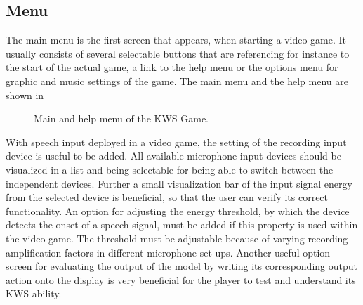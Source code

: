 \subsection{Menu}\label{sec:game_design_menu}
The main menu is the first screen that appears, when starting a video game. 
It usually consists of several selectable buttons that are referencing for instance to the start of the actual game, a link to the help menu or the options menu for graphic and music settings of the game.
The main menu and the help menu are shown in 
\begin{figure}[!ht]
  \centering
  \qquad
  \caption{Main and help menu of the KWS Game.}
  \label{fig:game_design_menu_mainhelp}
\end{figure}
\FloatBarrier
\noindent
With speech input deployed in a video game, the setting of the recording input device is useful to be added.
All available microphone input devices should be visualized in a list and being selectable for being able to switch between the independent devices.
Further a small visualization bar of the input signal energy from the selected device is beneficial, so that the user can verify its correct functionality.
An option for adjusting the energy threshold, by which the device detects the onset of a speech signal, must be added if this property is used within the video game.
The threshold must be adjustable because of varying recording amplification factors in different microphone set ups.
Another useful option screen for evaluating the output of the model by writing its corresponding output action onto the display is very beneficial for the player to test and understand its KWS ability.
